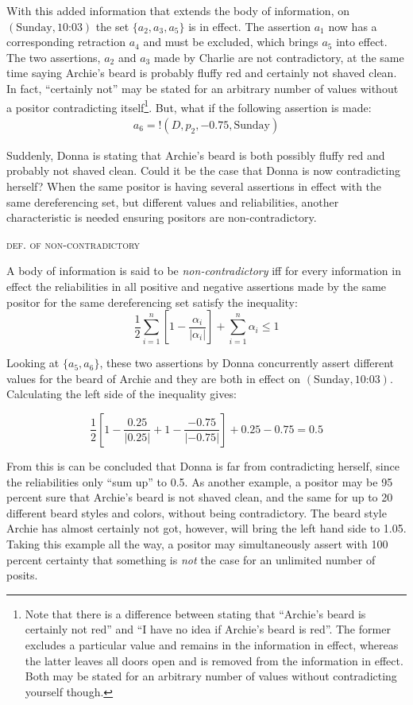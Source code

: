 \documentclass[sfsidenotes,nobib,twoside,symmetric]{tufte-handout}
\newcommand{\assert}{\text{!}}
\newcounter{majorcount}
\newcommand{\deffy}[3]{
	\vspace{2ex}
	\refstepcounter{majorcount} 
	\noindent\textsc{#1}%
	\\\begin{small}
	\noindent #2%
	\label{Def:#3}
	\end{small}
	\vspace{2ex}
}
\begin{document}
With this added information that extends the body of information, on $(\textrm{Sunday}, \textrm{10:03})$ the set $\{a_2, a_3, a_5\}$ is in effect. The assertion $a_1$ now has a corresponding retraction $a_4$ and must be excluded, which brings $a_5$ into effect. The two assertions, $a_2$ and $a_3$ made by Charlie are not contradictory, at the same time saying Archie's beard is probably fluffy red and certainly not shaved clean. In fact, \enquote{certainly not} may be stated for an arbitrary number of values without a positor contradicting itself\footnote{Note that there is a difference between stating that \enquote{Archie's beard is certainly not red} and \enquote{I have no idea if Archie's beard is red}. The former excludes a particular value and remains in the information in effect, whereas the latter leaves all doors open and is removed from the information in effect. Both may be stated for an arbitrary number of values without contradicting yourself though.}. But, what if the following assertion is made:
\begin{align*}
a_6 = \assert(D, p_2, -0.75, \textrm{Sunday}) 
\end{align*}

Suddenly, Donna is stating that Archie's beard is both possibly fluffy red and probably not shaved clean. Could it be the case that Donna is now contradicting herself? When the same positor is having several assertions in effect with the same dereferencing set, but different values and reliabilities, another characteristic is needed ensuring positors are non-contradictory.

\deffy{def. of non-contradictory}{%
A body of information is said to be \emph{non-contradictory} iff for every information in effect the reliabilities in all positive and negative assertions made by the same positor for the same dereferencing set satisfy the inequality: $$\frac{1}{2}\sum_{i = 1}^{n}\left[1 - \frac{\alpha_i}{|\alpha_i|}\right ] + \sum_{i = 1}^{n}\alpha_i \leq 1$$
}{contradictions}

Looking at $\{a_5, a_6\}$, these two assertions by Donna concurrently assert different values for the beard of Archie and they are both in effect on $(\textrm{Sunday}, \textrm{10:03})$. Calculating the left side of the inequality gives:
\begin{small}
$$\frac{1}{2}\left[1-\frac{0.25}{|0.25|}+1-\frac{-0.75}{|-0.75|}\right] + 0.25 - 0.75 = 0.5$$
\end{small}

From this is can be concluded that Donna is far from contradicting herself, since the reliabilities only \enquote{sum up} to 0.5. As another example, a positor may be 95 percent sure that Archie's beard is not shaved clean, and the same for up to 20 different beard styles and colors, without being contradictory. The  beard style Archie has almost certainly not got, however, will bring the left hand side to 1.05. Taking this example all the way, a positor may simultaneously assert with 100 percent certainty that something is \emph{not} the case for an unlimited number of posits.
\end{document}
